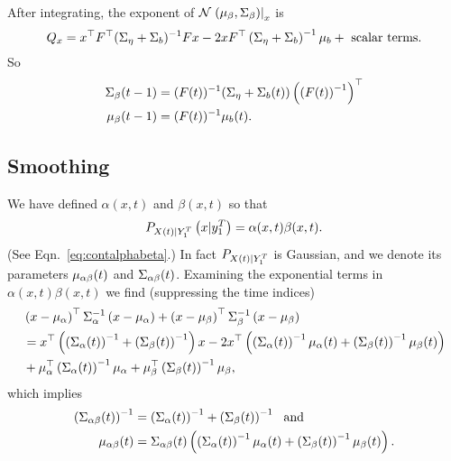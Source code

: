 After integrating, the exponent of
${\mathcal{N}}\left.\left(\mu_\beta,\Sigma_\beta\right)\right|_{x}$ is
\begin{equation*}
  Q_x = x^\top F^\top (\Sigma_\eta + \Sigma_b)^{-1} Fx - 2x
  F^\top \left(\Sigma_\eta + \Sigma_b \right)^{-1}\mu_b +
  \text{ scalar terms}. 
\end{equation*}
So
\begin{align*}
  {\Sigma_\beta}{(t-1)} &= ({F}{(t)})^{-1} ( \Sigma_\eta +
  {\Sigma_b}{(t)} ) \left( \left( {F}{(t)} \right)^{-1}
  \right)^\top
  \\
  {\mu_\beta}{(t-1)} &= ({F}{(t)})^{-1}{\mu_b}{(t)}.
\end{align*}

\subsection{Smoothing}
\label{sec:DetailSmoothing}

We have defined $\alpha(x,t)$ and $\beta(x,t)$ so that
\begin{equation*}
   P_{{X}{(t)}|Y_{1}^{T}} \left(x|y_{1}^{T} \right) =
   \alpha(x,t) \beta(x,t).
\end{equation*}
(See Eqn.~\eqref{eq:contalphabeta}.)  In fact
$P_{{X}{(t)}|Y_{1}^{T}}$ is Gaussian, and we denote its parameters
${\mu_{\alpha \beta}}{(t)}$ and ${\Sigma_{\alpha \beta}}{(t)}$.
Examining the exponential terms in $\alpha(x,t) \beta(x,t)$ we find
(suppressing the time indices)
\begin{align*}
  &\left( x - \mu_\alpha \right)^\top \Sigma_\alpha^{-1} \left( x
    - \mu_\alpha \right) + \left( x - \mu_\beta \right)^\top
  \Sigma_\beta^{-1} \left( x - \mu_\beta \right)\\
  & = x^\top \left( \left( {\Sigma_{\alpha}}{(t)} \right)^{-1} + \left(
      {\Sigma_{\beta}}{(t)} \right)^{-1} \right) x - 2x^\top
  \left( \left( {\Sigma_{\alpha}}{(t)} \right)^{-1}
  {\mu_{\alpha}}{(t)} + \left( {\Sigma_{\beta}}{(t)} \right)^{-1}
  {\mu_{\beta}}{(t)} \right) \\
& + \mu_\alpha^\top  \left(
  {\Sigma_{\alpha}}{(t)} \right)^{-1} \mu_\alpha +
  \mu_\beta^\top  \left( {\Sigma_{\beta}}{(t)} \right)^{-1}
  \mu_\beta ,
\end{align*}
which implies
\begin{subequations}
  \begin{align}
    \left( {\Sigma_{\alpha \beta}}{(t)} \right)^{-1} &= \left(
      {\Sigma_{\alpha}}{(t)} \right)^{-1} + \left(
      {\Sigma_{\beta}}{(t)} \right)^{-1} ~\text{ and} \\
    {\mu_{\alpha \beta}}{(t)} &=
    {\Sigma_{\alpha \beta}}{(t)} \left( \left(
        {\Sigma_{\alpha}}{(t)} \right)^{-1} {\mu_{\alpha}}{(t)} +
      \left( {\Sigma_{\beta}}{(t)} \right)^{-1} {\mu_{\beta}}{(t)}
    \right).
\end{align}
\end{subequations}

